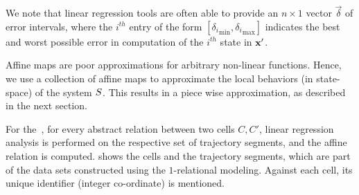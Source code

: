 
We note that linear regression tools are often able to provide an
$n\times 1$ vector $\vec{\delta}$ of error intervals, where the
$i^{th}$ entry of the form $[{\delta_i}_{\min},{\delta_i}_{\max}]$
indicates the best and worst possible error in computation of the
$i^{th}$ state in $\mathbf{x}'$.

Affine maps are poor approximations for arbitrary non-linear
functions. Hence, we use a collection of affine maps to approximate
the local behaviors (in state-space) of the system $S$. This
results in a piece wise approximation, as described in the next
section.

\begin{example}
    For the~, for every abstract relation between two cells
    $C, C'$, linear regression analysis is performed on the respective
    set of trajectory segments, and the affine relation is computed.
     shows the cells and the trajectory segments, which
    are part of the data sets constructed using the $1$-relational
    modeling. Against each cell, its unique identifier (integer
    co-ordinate) is mentioned.
\end{example}
